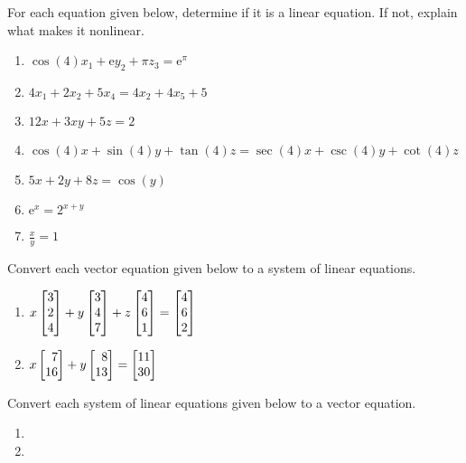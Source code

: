 \begin{exercises}
	\begin{problist}
		\prob For each equation given below, determine if it is a linear
		equation. If not, explain what makes it nonlinear.
		\begin{enumerate}
			\item $\cos(4)x_{1}+\mathrm{e}y_{2}+\pi z_{3}=\mathrm{e}^{\pi}$

			\item $4x_{1}+2x_{2}+5x_{4}=4x_{2}+4x_{5}+5$

			\item $12x+3xy+5z=2$

			\item $\cos(4)x+\sin(4)y+\tan(4)z=\sec(4)x+\csc(4)y+\cot(4)z$

			\item $5x+2y+8z=\cos(y)$

			\item $\mathrm{e}^{x}=2^{x+y}$

			\item $\frac{x}{y}=1$
		\end{enumerate}

		\prob Convert each vector equation given below to a system of linear
		equations.

		\begin{enumerate}
			\item $x\mat{3 \\ 2 \\ 4}+y\mat{3 \\ 4 \\ 7}+z\mat{4 \\ 6 \\ 1}=\mat{4 \\ 6 \\ 2}$

			\item $x\mat{7 \\ 16}+y\mat{8 \\ 13}=\mat{11 \\ 30}$
		\end{enumerate}

		\prob Convert each system of linear equations given below to a vector equation.
		\begin{enumerate}
			\item {}

			\item {}
		\end{enumerate}


\end{problist}
\end{exercises}
